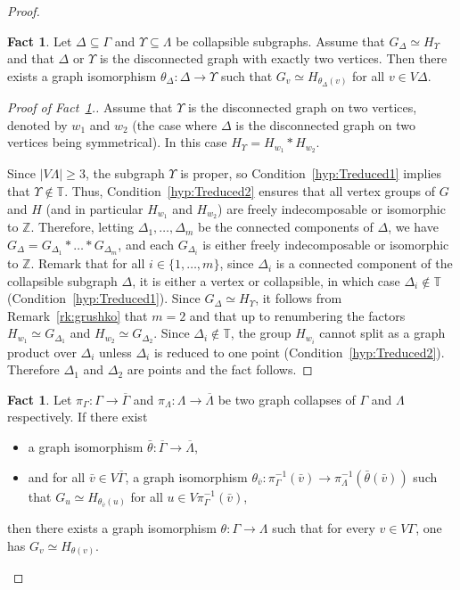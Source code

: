 \documentclass[a4paper,english,11pt]{article}
\theoremstyle{definition}
\newtheorem{Fact}[de]{Fact}
\theoremstyle{remark}
\newcommand{\bZ}{\mathbb{Z}}
\begin{document}
\begin{proof}
\begin{Fact}
\label{Fact:Disconnected-with-two-vertices} Let $\Delta\subseteq \Gamma$ and $\Upsilon\subseteq \Lambda$ be collapsible subgraphs. Assume that $G_\Delta \simeq H_\Upsilon$ and that $\Delta$ or $\Upsilon$ is the disconnected graph with exactly two vertices. Then there exists a graph isomorphism
$\theta_\Delta:\Delta\rightarrow \Upsilon$ such that $G_{v}\simeq H_{\theta_\Delta(v)}$ for all $v\in V\Delta$.
\end{Fact}
\begin{proof}[Proof of Fact~\ref{Fact:Disconnected-with-two-vertices}.]
Assume that $\Upsilon$ is the disconnected graph on two vertices, denoted by $w_1$ and $w_2$ (the case where $\Delta$ is the disconnected graph on two vertices being symmetrical). In this case $H_{\Upsilon}=H_{w_1}*H_{w_2}$. 

Since $|V\Lambda|\ge 3$, the subgraph $\Upsilon$ is proper, so Condition~\ref{hyp:Treduced1} implies that $\Upsilon \notin \mathbb{T}$. Thus, Condition~\ref{hyp:Treduced2} ensures that all vertex groups of $G$ and $H$ (and in particular $H_{w_1}$ and $H_{w_2}$) are freely indecomposable or isomorphic to $\bZ$. Therefore, letting $\Delta_1,\dots,\Delta_m$ be the connected components of $\Delta$,
we have $G_\Delta=G_{\Delta_1}*\dots *G_{\Delta_{m}}$, and each $G_{\Delta_i}$ is either freely indecomposable or isomorphic to $\bZ$. Remark that for all $i\in\{1,\dots,m\}$, since $\Delta_i$ is a connected component of the collapsible subgraph $\Delta$, it is either a vertex or collapsible, in which case $\Delta_i\notin \mathbb{T}$ (Condition~\ref{hyp:Treduced1}). 
Since $G_\Delta\simeq H_\Upsilon$, it follows from Remark~\ref{rk:grushko} that $m=2$ and that up to renumbering the factors $H_{w_1}\simeq G_{\Delta_1}$ and $H_{w_2}\simeq G_{\Delta_2}$. Since $\Delta_i\notin \mathbb{T}$, the group $H_{w_i}$ cannot split as a graph product over $\Delta_i$ unless $\Delta_i$ is reduced to one point (Condition~\ref{hyp:Treduced2}). Therefore $\Delta_1$ and $\Delta_2$ are points and the fact follows.
\end{proof}

\begin{Fact}\label{Fact:graph-collapses} Let $\pi_\Gamma:\Gamma \rightarrow \overline{\Gamma}$ and $\pi_\Lambda:\Lambda \rightarrow \overline{\Lambda}$ be two graph collapses of $\Gamma$ and $\Lambda$ respectively. If there exist
\begin{itemize}
    \item a graph isomorphism $\bar{\theta}:\overline{\Gamma} \rightarrow \overline{\Lambda}$,
    \item and for all $\bar{v}\in V\overline{\Gamma}$, a graph isomorphism $\theta_{\bar{v}}:\pi^{-1}_\Gamma(\bar{v}) \rightarrow \pi^{-1}_\Lambda(\bar{\theta}(\bar{v}))$ such that $G_{u}\simeq H_{\theta_{\bar{v}}(u)}$ for all $u\in V\pi^{-1}_\Gamma(\bar{v})$,
\end{itemize}
then there exists a graph isomorphism ${\theta}:{\Gamma} \rightarrow {\Lambda}$ such that for every $v\in V\Gamma$, one has $G_v\simeq H_{\theta(v)}$.
\end{Fact}


\end{proof}
\end{document}
